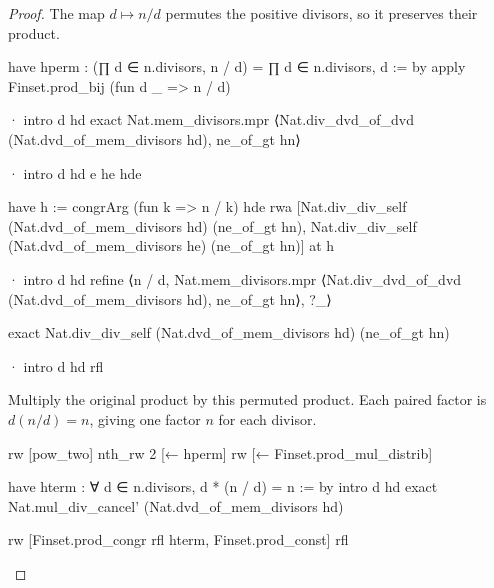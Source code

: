 \begin{proof}
  The map $d\mapsto n/d$ permutes the positive divisors, so it preserves their product.

  \begin{lean}
    have hperm : (∏ d ∈ n.divisors, n / d) = ∏ d ∈ n.divisors, d := by
      apply Finset.prod_bij (fun d _ => n / d)

      · intro d hd
        exact Nat.mem_divisors.mpr
          ⟨Nat.div_dvd_of_dvd (Nat.dvd_of_mem_divisors hd), ne_of_gt hn⟩

      · intro d hd e he hde

        have h := congrArg (fun k => n / k) hde
        rwa [Nat.div_div_self (Nat.dvd_of_mem_divisors hd) (ne_of_gt hn),
          Nat.div_div_self (Nat.dvd_of_mem_divisors he) (ne_of_gt hn)] at h

      · intro d hd
        refine ⟨n / d, Nat.mem_divisors.mpr
          ⟨Nat.div_dvd_of_dvd (Nat.dvd_of_mem_divisors hd), ne_of_gt hn⟩, ?_⟩

        exact Nat.div_div_self (Nat.dvd_of_mem_divisors hd) (ne_of_gt hn)

      · intro d hd
        rfl
  \end{lean}

  Multiply the original product by this permuted product.
  Each paired factor is $d(n/d)=n$, giving one factor $n$ for each divisor.

  \begin{lean}
    rw [pow_two]
    nth_rw 2 [← hperm]
    rw [← Finset.prod_mul_distrib]

    have hterm : ∀ d ∈ n.divisors, d * (n / d) = n := by
      intro d hd
      exact Nat.mul_div_cancel' (Nat.dvd_of_mem_divisors hd)

    rw [Finset.prod_congr rfl hterm, Finset.prod_const]
    rfl
  \end{lean}
\end{proof}
